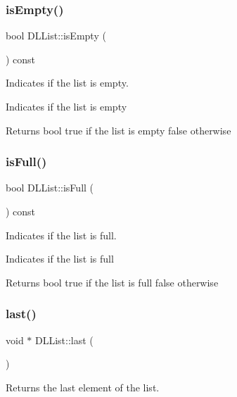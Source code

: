 \subsubsection{\texorpdfstring{is\+Empty()}{isEmpty()}}
{\footnotesize\ttfamily bool D\+L\+List\+::is\+Empty (\begin{DoxyParamCaption}{ }\end{DoxyParamCaption}) const}



Indicates if the list is empty. 

Indicates if the list is empty

\begin{DoxyReturn}{Returns}
bool true if the list is empty false otherwise 
\end{DoxyReturn}
\mbox{\label{class_d_l_list_ac070f23fc7a9617809e19c007884f1f0}} 
\subsubsection{\texorpdfstring{is\+Full()}{isFull()}}
{\footnotesize\ttfamily bool D\+L\+List\+::is\+Full (\begin{DoxyParamCaption}{ }\end{DoxyParamCaption}) const}



Indicates if the list is full. 

Indicates if the list is full

\begin{DoxyReturn}{Returns}
bool true if the list is full false otherwise 
\end{DoxyReturn}
\mbox{\label{class_d_l_list_a76dad466eebcb03e5897573a018ff54d}} 
\subsubsection{\texorpdfstring{last()}{last()}}
{\footnotesize\ttfamily void $\ast$ D\+L\+List\+::last (\begin{DoxyParamCaption}{ }\end{DoxyParamCaption})}



Returns the last element of the list. 

